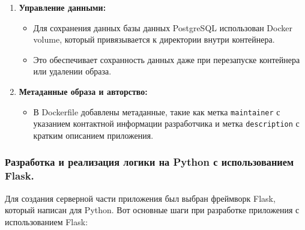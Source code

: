 \documentclass[12pt, russian]{extarticle}
\begin{document}
\begin{spacing}{1.5}
\begin{enumerate}
\begin{itemize}
        \end{itemize}
        \item \textbf{Управление данными:}
        \begin{itemize}
            \item Для сохранения данных базы данных PostgreSQL использован Docker volume, который
                привязывается к директории внутри контейнера.
            \item Это обеспечивает сохранность данных даже при перезапуске контейнера или удалении образа.
        \end{itemize}
        \item \textbf{Метаданные образа и авторство:}
        \begin{itemize}
            \item В Dockerfile добавлены метаданные, такие как метка \texttt{maintainer} с указанием
                контактной информации разработчика и метка \texttt{description} с кратким описанием приложения.
        \end{itemize}
    \end{enumerate}

    \subsubsection{Разработка и реализация логики на Python с использованием Flask.}

    Для создания серверной части приложения был выбран фреймворк Flask, который написан для Python.
    Вот основные шаги при разработке приложения с использованием Flask:


\end{spacing}
\end{document}
